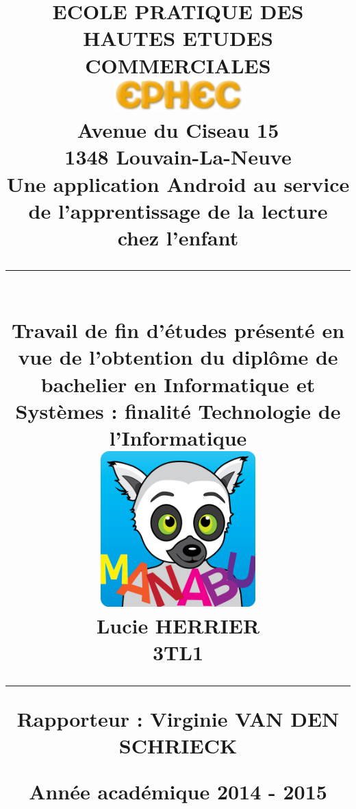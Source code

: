 \title{
\parbox{15cm}
{	
	\begin{center}
	\vspace{-1cm}
	\large ECOLE PRATIQUE DES HAUTES ETUDES COMMERCIALES\\
	\vspace{.5cm}
	\includegraphics[width=5cm]{ephec.png}\\
	Avenue du Ciseau 15\\
	1348 Louvain-La-Neuve\\
	\vspace{1cm}
	\sf\bfseries\Huge
	Une application Android au service de l'apprentissage de la lecture chez l'enfant 
	\rule{15cm}{1pt}\\
	\normalsize\mdseries Travail de fin d'études présenté en vue de l'obtention du diplôme de bachelier en Informatique et Systèmes : finalité Technologie de l'Informatique\\
	\vspace{.5cm}
	\includegraphics[width=6cm]{img/imanabu.png}\\
	\vspace{.5cm}
	\bfseries\LARGE
		Lucie HERRIER\\ \Large 3TL1
	\rule{15cm}{1pt}
	\end{center}
	\vspace{0.5cm}
	\bf\normalsize Rapporteur : Virginie VAN DEN SCHRIECK
	\begin{center}
	\vspace{1cm}
	\Large Année académique 2014 - 2015
	\end{center}
}} 
